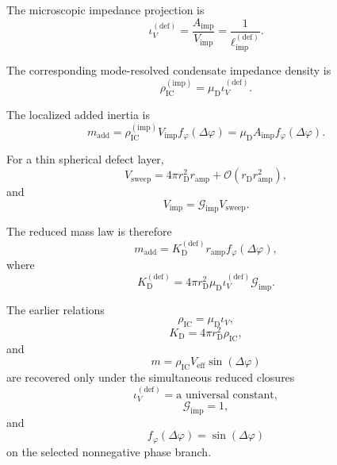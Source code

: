 The microscopic impedance projection is
\begin{equation}
    \boxed{ \iota_V^{(\mathrm{def})} = \frac{ A_{\mathrm{imp}} }{ V_{\mathrm{imp}} } = \frac{1}{ \ell_{\mathrm{imp}}^{(\mathrm{def})} } }.
\end{equation}

The corresponding mode-resolved condensate impedance density is
\begin{equation}
    \boxed{ \rho_{\mathrm{IC}}^{(\mathrm{imp})} = \mu_{\mathrm{D}} \iota_V^{(\mathrm{def})} }.
\end{equation}

The localized added inertia is
\begin{equation}
    \boxed{ m_{\mathrm{add}} = \rho_{\mathrm{IC}}^{(\mathrm{imp})} V_{\mathrm{imp}} f_{\varphi}(\Delta\varphi) = \mu_{\mathrm{D}} A_{\mathrm{imp}} f_{\varphi}(\Delta\varphi) }.
\end{equation}

For a thin spherical defect layer,
\begin{equation}
    V_{\mathrm{sweep}} = 4\pi r_{\mathrm{D}}^2 r_{\mathrm{amp}} + \mathcal{O} \left( r_{\mathrm{D}}r_{\mathrm{amp}}^2 \right),
\end{equation}
and
\begin{equation}
    V_{\mathrm{imp}} = \mathcal{G}_{\mathrm{imp}} V_{\mathrm{sweep}}.
\end{equation}

The reduced mass law is therefore
\begin{equation}
    \boxed{ m_{\mathrm{add}} = K_{\mathrm{D}}^{(\mathrm{def})} r_{\mathrm{amp}} f_{\varphi}(\Delta\varphi) },
\end{equation}
where
\begin{equation}
    \boxed{ K_{\mathrm{D}}^{(\mathrm{def})} = 4\pi r_{\mathrm{D}}^2 \mu_{\mathrm{D}} \iota_V^{(\mathrm{def})} \mathcal{G}_{\mathrm{imp}} }.
\end{equation}

The earlier relations
\begin{equation}
    \rho_{\mathrm{IC}} = \mu_{\mathrm{D}}\iota_V,
\end{equation}
\begin{equation}
    K_{\mathrm{D}} = 4\pi r_{\mathrm{D}}^2\rho_{\mathrm{IC}},
\end{equation}
and
\begin{equation}
    m = \rho_{\mathrm{IC}} V_{\mathrm{eff}} \sin(\Delta\varphi)
\end{equation}
are recovered only under the simultaneous reduced closures
\begin{equation}
    \iota_V^{(\mathrm{def})} = \text{a universal constant},
\end{equation}
\begin{equation}
    \mathcal{G}_{\mathrm{imp}} = 1,
\end{equation}
and
\begin{equation}
    f_{\varphi}(\Delta\varphi) = \sin(\Delta\varphi)
\end{equation}
on the selected nonnegative phase branch.

